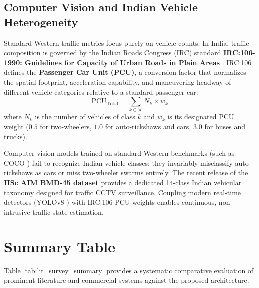 \documentclass[12pt,a4paper,oneside]{report}
\begin{document}
\subsection{Computer Vision and Indian Vehicle Heterogeneity}
Standard Western traffic metrics focus purely on vehicle counts. In India, traffic composition is governed by the Indian Roads Congress (IRC) standard \textbf{IRC:106-1990: Guidelines for Capacity of Urban Roads in Plain Areas} \cite{ref_irc106}. IRC:106 defines the \textbf{Passenger Car Unit (PCU)}, a conversion factor that normalizes the spatial footprint, acceleration capability, and maneuvering headway of different vehicle categories relative to a standard passenger car:
\begin{equation}
\text{PCU}_{\text{Total}} = \sum_{k \in \mathcal{K}} N_k \times w_k
\end{equation}
where $N_k$ is the number of vehicles of class $k$ and $w_k$ is its designated PCU weight ($0.5$ for two-wheelers, $1.0$ for auto-rickshaws and cars, $3.0$ for buses and trucks).

Computer vision models trained on standard Western benchmarks (such as COCO \cite{ref_lin2014coco}) fail to recognize Indian vehicle classes; they invariably misclassify auto-rickshaws as cars or miss two-wheeler swarms entirely. The recent release of the \textbf{IISc AIM BMD-45 dataset} \cite{ref_iisc_bmd45} provides a dedicated 14-class Indian vehicular taxonomy designed for traffic CCTV surveillance. Coupling modern real-time detectors (YOLOv8 \cite{ref_yolov8}) with IRC:106 PCU weights enables continuous, non-intrusive traffic state estimation.

\section{Summary Table}
\label{sec:lit_summary_table}
Table \ref{tab:lit_survey_summary} provides a systematic comparative evaluation of prominent literature and commercial systems against the proposed architecture.
\end{document}
